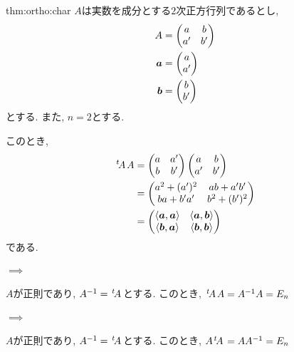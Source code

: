 \begin{proofof}{thm:ortho:char}
  $A$は実数を成分とする$2$次正方行列であるとし,
  \begin{align*}
    A&=
    \begin{pmatrix}
      a&b\\
      a'&b'
    \end{pmatrix}\\
    \boldsymbol{a}&=
    \begin{pmatrix}
      a\\
      a'
    \end{pmatrix}\\
    \boldsymbol{b}&=
    \begin{pmatrix}
      b\\
      b'
    \end{pmatrix}
  \end{align*}
  とする.
  また, $n=2$とする.

  このとき,
  \begin{align*}
    {\left.^{t}\!A\right.}A&=
    \begin{pmatrix}
      a&a'\\
      b&b'
    \end{pmatrix}
    \begin{pmatrix}
      a&b\\
      a'&b'
    \end{pmatrix}\\
    &=
    \begin{pmatrix}
      a^2+(a')^2&ab+a'b'\\
      ba+b'a'&b^2+(b')^2
    \end{pmatrix}\\
    &=
    \begin{pmatrix}
      \Braket{\boldsymbol{a},\boldsymbol{a}}&\Braket{\boldsymbol{a},\boldsymbol{b}}\\
      \Braket{\boldsymbol{b},\boldsymbol{a}}&\Braket{\boldsymbol{b},\boldsymbol{b}}
    \end{pmatrix}
  \end{align*}
  である.
  
  \paragraph{$\implies$}
  $A$が正則であり,
  $A^{-1}={\left.^{t}\!A\right.}$とする.
  このとき,
  ${\left.^{t}\!A\right.}A=A^{-1}A=E_n$

  \paragraph{$\implies$}
  $A$が正則であり,
  $A^{-1}={\left.^{t}\!A\right.}$とする.
  このとき,
  $A{\left.^{t}\!A\right.}=AA^{-1}=E_n$


\end{proofof}

